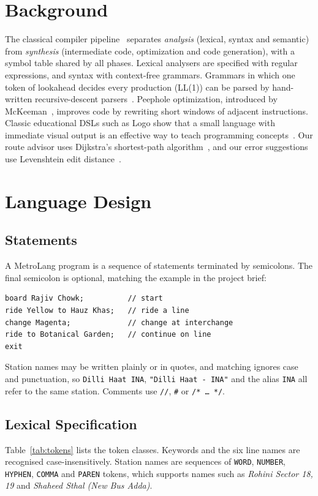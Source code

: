 \documentclass[conference]{IEEEtran}
\begin{document}
\section{Background}
The classical compiler pipeline~\cite{aho2006} separates \emph{analysis} (lexical, syntax and semantic) from \emph{synthesis} (intermediate code, optimization and code generation), with a symbol table shared by all phases. Lexical analysers are specified with regular expressions, and syntax with context-free grammars. Grammars in which one token of lookahead decides every production (LL(1)) can be parsed by hand-written recursive-descent parsers~\cite{appel1998,cooper2011}. Peephole optimization, introduced by McKeeman~\cite{mckeeman1965}, improves code by rewriting short windows of adjacent instructions. Classic educational DSLs such as Logo show that a small language with immediate visual output is an effective way to teach programming concepts~\cite{papert1980}. Our route advisor uses Dijkstra's shortest-path algorithm~\cite{dijkstra1959}, and our error suggestions use Levenshtein edit distance~\cite{levenshtein1966}.

\section{Language Design}\label{sec:lang}

\subsection{Statements}
A MetroLang program is a sequence of statements terminated by semicolons. The final semicolon is optional, matching the example in the project brief:
\begin{lstlisting}[language=MetroLang]
board Rajiv Chowk;          // start
ride Yellow to Hauz Khas;   // ride a line
change Magenta;             // change at interchange
ride to Botanical Garden;   // continue on line
exit
\end{lstlisting}
Station names may be written plainly or in quotes, and matching ignores case and punctuation, so \texttt{Dilli Haat INA}, \texttt{"Dilli Haat - INA"} and the alias \texttt{INA} all refer to the same station. Comments use \texttt{//}, \texttt{\#} or \texttt{/*\,\ldots\,*/}.

\subsection{Lexical Specification}
Table~\ref{tab:tokens} lists the token classes. Keywords and the six line names are recognised case-insensitively. Station names are sequences of \texttt{WORD}, \texttt{NUMBER}, \texttt{HYPHEN}, \texttt{COMMA} and \texttt{PAREN} tokens, which supports names such as \emph{Rohini Sector 18, 19} and \emph{Shaheed Sthal (New Bus Adda)}.
\end{document}
